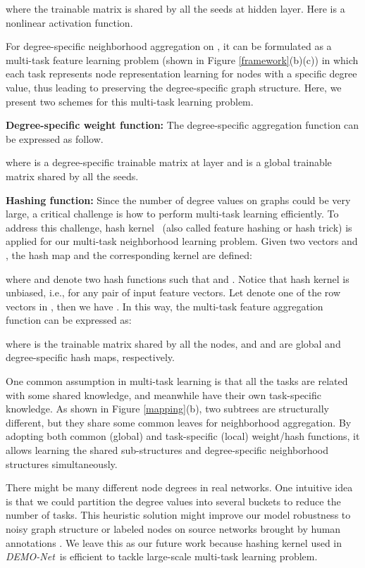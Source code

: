 \documentclass[sigconf]{acmart}
\newcommand{\demonet}{{\emph {DEMO-Net}}}
\begin{document}
where the trainable matrix  is shared by all the seeds at  hidden layer. Here  is a nonlinear activation function. 

For degree-specific neighborhood aggregation on , it can be formulated as a multi-task feature learning problem (shown in Figure \ref{framework}(b)(c)) in which each task represents node representation learning for nodes with a specific degree value, thus leading to preserving the degree-specific graph structure. Here, we present two schemes for this multi-task learning problem.

\noindent\textbf{Degree-specific weight function: } The degree-specific aggregation function can be expressed as follow.

where  is a degree-specific trainable matrix at  layer and  is a global trainable matrix shared by all the seeds.

\noindent\textbf{Hashing function:} Since the number of degree values on graphs could be very large, a critical challenge is how to perform multi-task learning efficiently. To address this challenge, hash kernel~\cite{weinberger2009feature} (also called feature hashing or hash trick) is applied for our multi-task neighborhood learning problem. Given two vectors  and , the hash map  and the corresponding kernel  are defined:


where  and  denote two hash functions such that  and . Notice that hash kernel is unbiased, i.e.,  for any pair of input feature vectors. Let  denote one of the row vectors in , then we have . In this way, the multi-task feature aggregation function  can be expressed as:

where  is the trainable matrix shared by all the nodes, and  and  are global and degree-specific hash maps, respectively. 

One common assumption in multi-task learning is that all the tasks are related with some shared knowledge, and meanwhile have their own task-specific knowledge. As shown in Figure \ref{mapping}(b), two subtrees are structurally different, but they share some common leaves for neighborhood aggregation. By adopting both common (global) and task-specific (local) weight/hash functions, it allows learning the shared sub-structures and degree-specific neighborhood structures simultaneously.

There might be many different node degrees in real networks. One intuitive idea is that we could partition the degree values into several buckets to reduce the number of tasks. This heuristic solution might improve our model robustness to noisy graph structure or labeled nodes on source networks brought by human annotations \cite{zhou2016crowdsourcing, zhou2017multic2}.
We leave this as our future work because hashing kernel \cite{weinberger2009feature} used in \demonet\ is efficient to tackle large-scale multi-task learning problem.
\end{document}
